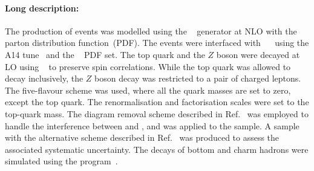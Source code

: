 \paragraph{Long description:}

The production of \tWZ events was modelled using the \MGNLO[2.3.3]~\cite{Alwall:2014hca}
generator at NLO with the \NNPDF[3.0nlo]~\cite{Ball:2014uwa} parton distribution function~(PDF). The events were interfaced with
\PYTHIA[8.212]~\cite{Sjostrand:2014zea}~ using the A14 tune~\cite{ATL-PHYS-PUB-2014-021} and the \NNPDF[2.3lo]~\cite{Ball:2014uwa} PDF set.
The top quark and the $Z$ boson were decayed at LO using \MADSPIN~\cite{Frixione:2007zp,Artoisenet:2012st} to preserve spin correlations.
While the top quark was allowed to decay inclusively, the $Z$ boson decay was restricted to a pair of charged leptons.
The five-flavour scheme was used, where all the quark masses are set to zero, except the top quark. 
The renormalisation and factorisation scales were set to the top-quark mass.
The diagram removal scheme described in Ref.~\cite{Frixione:2008yi} was employed to handle the interference 
between \tWZ and \ttZ, and was applied to the \tWZ sample.
A sample with the alternative scheme described in Ref.~\cite{Demartin:2016axk} was produced to assess the associated systematic uncertainty.
The decays of bottom and charm hadrons were simulated using the \EVTGEN[1.2.0] program~\cite{Lange:2001uf}.

